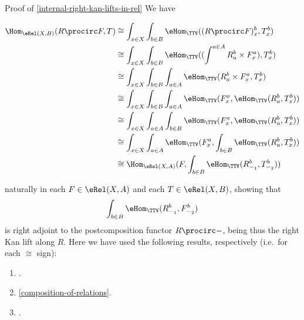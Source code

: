 \begin{Proof}{Proof of \cref{internal-right-kan-lifts-in-rel}}%
    We have
    \begin{envsmallsize}
        \begin{align*}
            \Hom_{\eRel(X,B)}(R\procirc F,T) &\cong  \int_{x\in X}\int_{b\in B}\eHom_{\TTV}((R\procirc F)^{b}_{x},T^{b}_{x})\\
                                             &\cong  \int_{x\in X}\int_{b\in B}\eHom_{\TTV}((\int^{a\in A}R^{b}_{a}\times F^{a}_{x}),T^{b}_{x})\\
                                             &\cong  \int_{x\in X}\int_{b\in B}\int_{a\in A}\eHom_{\TTV}(R^{b}_{a}\times F^{a}_{x},T^{b}_{x})\\
                                             &\cong  \int_{x\in X}\int_{b\in B}\int_{a\in A}\eHom_{\TTV}(F^{a}_{x},\eHom_{\TTV}(R^{b}_{a},T^{b}_{x}))\\
                                             &\cong  \int_{x\in X}\int_{a\in A}\int_{b\in B}\eHom_{\TTV}(F^{a}_{x},\eHom_{\TTV}(R^{b}_{a},T^{b}_{x}))\\
                                             &\cong  \int_{x\in X}\int_{a\in A}\eHom_{\TTV}(F^{a}_{x},\int_{b\in B}\eHom_{\TTV}(R^{b}_{a},T^{b}_{x}))\\
                                             &\cong  \Hom_{\eRel(X,A)}(F,\int_{b\in B}\eHom_{\TTV}(R^{b}_{-_{1}},T^{b}_{-_{2}}))%
        \end{align*}
    \end{envsmallsize}
    naturally in each $F\in\eRel(X,A)$ and each $T\in\eRel(X,B)$, showing that
    \[
        \int_{b\in B}\eHom_{\TTV}(R^{b}_{-_{1}},F^{b}_{-_{2}})%
    \]%
    is right adjoint to the postcomposition functor $R\procirc-$, being thus the right Kan lift along $R$. Here we have used the following results, respectively (i.e.\ for each $\cong$ sign):
    \begin{enumerate}
        \item\label{proof-of-existence-of-internal-right-kan-lifts-in-rel-1}.
        \item\label{proof-of-existence-of-internal-right-kan-lifts-in-rel-2}\cref{composition-of-relations}.
        \item\label{proof-of-existence-of-internal-right-kan-lifts-in-rel-3}.

\end{enumerate}
\end{Proof}

